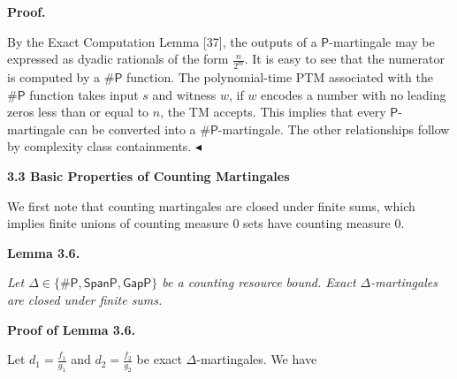 


\par\medskip\noindent\textbf{Proof.}\par




By the Exact Computation Lemma [37], the
outputs of a $\mathsf{P}$-martingale may be expressed as dyadic rationals of the form $\frac{n}{2^{m}}$. It is easy to see that
the numerator is computed by a ${\mathsf{\#}\mathsf{P}}$ function. The polynomial-time PTM associated with the ${\mathsf{\#}\mathsf{P}}$ function takes input $s$ and witness $w$, if $w$ encodes a number with no leading zeros less than or equal to $n$, the TM accepts. This implies that every $\mathsf{P}$-martingale can be converted into a ${\mathsf{\#}\mathsf{P}}$-martingale. The other relationships follow by complexity class containments.
$\blacktriangleleft$\par






\par\medskip\noindent\textbf{
3.3 Basic Properties of Counting Martingales}\par




We first note that counting martingales are closed under finite sums, which implies finite unions of counting measure 0 sets have counting measure 0.\par





\par\medskip\noindent\textbf{
\textbf{Lemma 3.6}\textbf{.}
}\par



\emph{Let $\Delta\in\{{\mathsf{\#}\mathsf{P}},\mathsf{SpanP},\mathsf{GapP}\}$ be a counting resource bound.
Exact $\Delta$-martingales are closed under finite sums.}\par






\par\medskip\noindent\textbf{Proof of Lemma 3.6.}\par




Let $d_{1}=\frac{f_{1}}{g_{1}}$ and $d_{2}=\frac{f_{2}}{g_{2}}$ be exact
$\Delta$-martingales. We have\par


